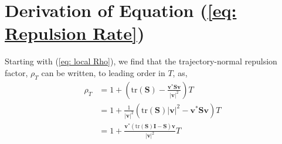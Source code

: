 \documentclass[onecolumn,3p]{elsarticle}
\begin{document}
	
	
	
	\appendix
	
	\section{Derivation of Equation (\ref{eq: Repulsion Rate})} \label{ap: normal derivation}
	Starting with (\ref{eq: local Rho}), we find that the trajectory-normal repulsion factor, \(\rho_T\) can be written, to leading order in $T$, as,
	\begin{equation}
	\begin{aligned}
	\rho_T &= 1+ \left(\text{tr}(\mathbf{S})-\frac{\mathbf{v}^*\mathbf{S}\mathbf{v}}{\left|\mathbf{v}\right|^2}\right)T \\
	&= 1+ \frac{1}{\left|\mathbf{v}\right|^2}(\text{tr}(\mathbf{S})\left|\mathbf{v}\right|^2-\mathbf{v}^*\mathbf{S}\mathbf{v})T  \\
	&= 1+ \frac{\mathbf{v}^*(\text{tr}(\mathbf{S})\mathbf{I} - \mathbf{S})\mathbf{v}}{\left|\mathbf{v}\right|^2}T
	\end{aligned}
	\end{equation}
	
\end{document}
